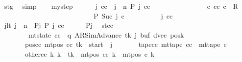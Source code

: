 \begin{isabellebody}
\ stg\ \isamarkupfalse%
\ simp\isanewline
\ \ \isamarkupfalse%
\ mystep{\isacharcolon}{\kern0pt}\isanewline
\ \ \ \ \ \ {\isachardoublequoteopen}{\isasymAnd}j\ cc{\isachardot}{\kern0pt}\ {\isasymlbrakk}\ j\ {\isacharless}{\kern0pt}\ n{\isacharsemicolon}{\kern0pt}\ {\isacharquery}{\kern0pt}P\ j\ cc\ {\isasymrbrakk}\isanewline
\ \ \ \ \ \ \ \ \ \ \ \ \ \ {\isasymLongrightarrow}\ {\isasymexists}c{\isacharprime}{\kern0pt}{\isacharprime}{\kern0pt}{\isachardot}{\kern0pt}\ {\isacharparenleft}{\kern0pt}cc{\isacharcomma}{\kern0pt}\ c{\isacharprime}{\kern0pt}{\isacharprime}{\kern0pt}{\isacharparenright}{\kern0pt}\ {\isasymin}\ R{\isacharprime}{\kern0pt}\isanewline
\ \ \ \ \ \ \ \ \ \ \ \ \ \ \ \ \ \ \ \ \ \ \ \ \ \ {\isasymand}\ {\isacharquery}{\kern0pt}P\ {\isacharparenleft}{\kern0pt}Suc\ j{\isacharparenright}{\kern0pt}\ c{\isacharprime}{\kern0pt}{\isacharprime}{\kern0pt}{\isachardoublequoteclose}\isanewline
\ \ \isamarkupfalse%
\ {\isacharminus}{\kern0pt}\isanewline
\ \ \ \ \isamarkupfalse%
\ j\ cc\isanewline
\ \ \ \ \isamarkupfalse%
\ jlt{\isacharcolon}{\kern0pt}\ {\isachardoublequoteopen}j\ {\isacharless}{\kern0pt}\ n{\isachardoublequoteclose}\ \ Pj{\isacharcolon}{\kern0pt}\ {\isachardoublequoteopen}{\isacharquery}{\kern0pt}P\ j\ cc{\isachardoublequoteclose}\isanewline
\ \ \ \ \isamarkupfalse%
\ Pj\ \isamarkupfalse%
\ st{\isacharunderscore}{\kern0pt}cc{\isacharcolon}{\kern0pt}\isanewline
\ \ \ \ \ \ \ \ {\isachardoublequoteopen}mt{\isacharunderscore}{\kern0pt}state\ cc\ {\isacharequal}{\kern0pt}\ {\isacharparenleft}{\kern0pt}q{\isacharcomma}{\kern0pt}\ AR{\isacharunderscore}{\kern0pt}SimAdvance{\isacharcomma}{\kern0pt}\ tk{\isacharcomma}{\kern0pt}\ j{\isacharcomma}{\kern0pt}\ buf{\isacharcomma}{\kern0pt}\ dvec{\isacharcomma}{\kern0pt}\ posk{\isacharparenright}{\kern0pt}{\isachardoublequoteclose}\isanewline
\ \ \ \ \ \ \ pos{\isacharunderscore}{\kern0pt}cc{\isacharcolon}{\kern0pt}\ {\isachardoublequoteopen}mt{\isacharunderscore}{\kern0pt}pos\ cc\ tk\ {\isacharequal}{\kern0pt}\ {\isacharquery}{\kern0pt}start\ {\isacharminus}{\kern0pt}\ j{\isachardoublequoteclose}\isanewline
\ \ \ \ \ \ \ tape{\isacharunderscore}{\kern0pt}cc{\isacharcolon}{\kern0pt}\ {\isachardoublequoteopen}mt{\isacharunderscore}{\kern0pt}tape\ cc\ {\isacharequal}{\kern0pt}\ mt{\isacharunderscore}{\kern0pt}tape\ c{}{\isachardoublequoteclose}\isanewline
\ \ \ \ \ \ \ other{\isacharunderscore}{\kern0pt}cc{\isacharcolon}{\kern0pt}\ {\isachardoublequoteopen}{\isasymforall}k{\isacharprime}{\kern0pt}{\isachardot}{\kern0pt}\ k{\isacharprime}{\kern0pt}\ {\isasymnoteq}\ tk\ {\isasymlongrightarrow}\ mt{\isacharunderscore}{\kern0pt}pos\ cc\ k{\isacharprime}{\kern0pt}\ {\isacharequal}{\kern0pt}\ mt{\isacharunderscore}{\kern0pt}pos\ c{}\ k{\isacharprime}{\kern0pt}{\isachardoublequoteclose}\isanewline

\end{isabellebody}
